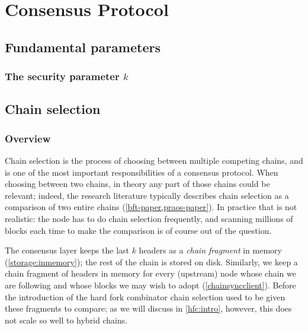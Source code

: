 \chapter{Consensus Protocol}


%
%

\section{Fundamental parameters}

\subsection{The security parameter $k$}
\label{param:k}

\section{Chain selection}
\label{chain-selection}

\subsection{Overview}
\label{chain-selection:overview}

Chain selection is the process of choosing between multiple competing chains,
and is one of the most important responsibilities of a consensus protocol. When
choosing between two chains, in theory any part of those chains could be
relevant; indeed, the research literature typically describes chain selection as
a comparison of two entire chains (\cref{bft-paper,praos-paper}). In practice
that is not realistic: the node has to do chain selection frequently, and
scanning millions of blocks each time to make the comparison is of course out of
the question.

The consensus layer keeps the last $k$ headers as a \emph{chain fragment} in
memory (\cref{storage:inmemory}); the rest of the chain is stored on disk.
Similarly, we keep a chain fragment of headers in memory for every (upstream)
node whose chain we are following and whose blocks we may wish to adopt
(\cref{chainsyncclient}). Before the introduction of the hard fork combinator
chain selection used to be given these fragments to compare; as we will discuss
in \cref{hfc:intro}, however, this does not scale so well to hybrid chains.

